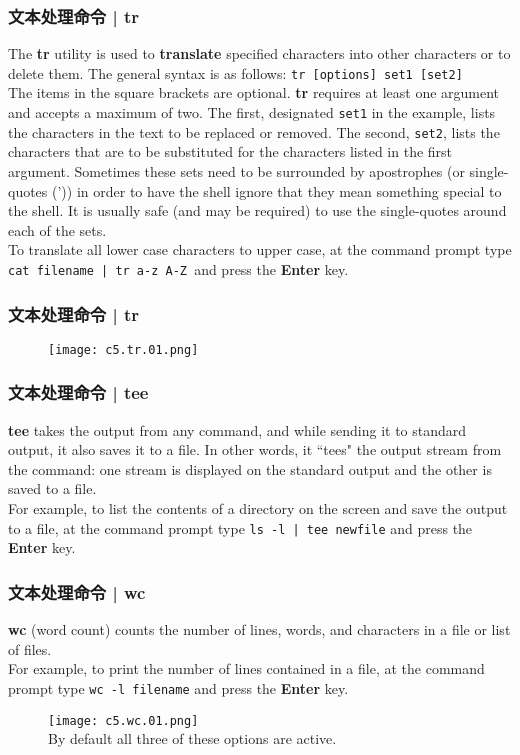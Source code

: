 \begin{frame}[fragile]
  \frametitle{文本处理命令 | tr}
  The \textbf{tr} utility is used to \textbf{translate} specified characters into other characters or to delete them. The general syntax is as follows: \verb|tr [options] set1 [set2]|\\
  \vspace{0.3cm}
  The items in the square brackets are optional. \textbf{tr} requires at least one argument and accepts a maximum of two. The first, designated \verb|set1| in the example, lists the characters in the text to be replaced or removed. The second, \verb|set2|, lists the characters that are to be substituted for the characters listed in the first argument. Sometimes these sets need to be surrounded by apostrophes (or single-quotes (')) in order to have the shell ignore that they mean something special to the shell. It is usually safe (and may be required) to use the single-quotes around each of the sets.\\
  \vspace{0.3cm}
  To translate all lower case characters to upper case, at the command prompt type \verb=cat filename | tr a-z A-Z =and press the \textbf{Enter} key.
\end{frame}

\begin{frame}
  \frametitle{文本处理命令 | tr}
  \begin{figure}
    \centering
    \texttt{[image: c5.tr.01.png]}
  \end{figure}
\end{frame}

\begin{frame}[fragile]
  \frametitle{文本处理命令 | tee}
  \textbf{tee} takes the output from any command, and while sending it to standard output, it also saves it to a file. In other words, it ``tees" the output stream from the command: one stream is displayed on the standard output and the other is saved to a file.\\
  \vspace{0.3cm}
  For example, to list the contents of a directory on the screen and save the output to a file, at the command prompt type \verb=ls -l | tee newfile= and press the \textbf{Enter} key.
\end{frame}

\begin{frame}[fragile]
  \frametitle{文本处理命令 | wc}
  \textbf{wc} (word count) counts the number of lines, words, and characters in a file or list of files.\\
  \vspace{0.3cm}
  For example, to print the number of lines contained in a file, at the command prompt type \verb|wc -l filename| and press the \textbf{Enter} key.
  \begin{figure}
    \centering
    \texttt{[image: c5.wc.01.png]}\\
  By default all three of these options are active.
  \end{figure}
\end{frame}

